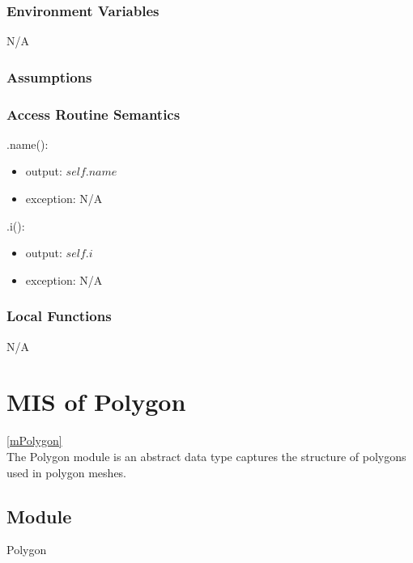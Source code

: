 \documentclass[12pt, titlepage]{article}
\begin{document}
\subsubsection{Environment Variables}
N/A

\subsubsection{Assumptions}

\subsubsection{Access Routine Semantics}
\noindent .name():
\begin{itemize}
	\item output: $self.name$
	\item exception: N/A
\end{itemize}

\noindent .i():
\begin{itemize}
	\item output: $self.i$
	\item exception: N/A
\end{itemize}

\subsubsection{Local Functions}
N/A

\newpage

\section{MIS of Polygon} \ref{mPolygon} \\
The Polygon module is an abstract data type captures the structure of polygons 
used in polygon meshes.

\subsection{Module}
Polygon
\end{document}
